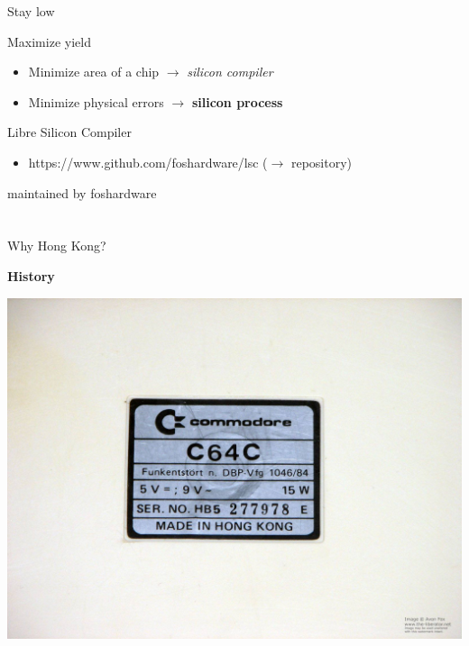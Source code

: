 \documentclass[aspectratio=169]{beamer}
\begin{document}
\begin{frame}{Stay low}
\end{frame}

\begin{frame}{Maximize yield}
	\begin{itemize}
        \setlength\itemsep{1em}
		\item Minimize area of a chip $\rightarrow$ \textit{silicon compiler}
		\item Minimize physical errors $\rightarrow$ \textbf{silicon process}
	\end{itemize}
\end{frame}

\begin{frame}{Libre Silicon Compiler}
	\begin{itemize}
        \setlength\itemsep{1em}
		\item https://www.github.com/foshardware/lsc ($\rightarrow$ repository)
	\end{itemize}

maintained by foshardware
\end{frame}

\section[Process]{}

\begin{frame}{Why Hong Kong?}
	\begin{center}
		 \textbf{History}

		\includegraphics[height=0.7\textheight]{images/15443222_1411927645507464_7594635994572097245_o.jpg}
	\end{center}
\end{frame}
\end{document}

